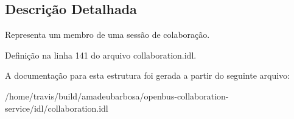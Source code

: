 \subsection{\-Descrição \-Detalhada}
\-Representa um membro de uma sessão de colaboração. 

\-Definição na linha 141 do arquivo collaboration.\-idl.



\-A documentação para esta estrutura foi gerada a partir do seguinte arquivo\-:\begin{DoxyCompactItemize}
\item 
/home/travis/build/amadeubarbosa/openbus-\/collaboration-\/service/idl/collaboration.\-idl\end{DoxyCompactItemize}

